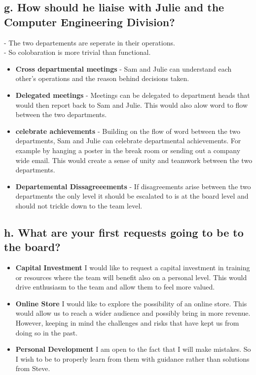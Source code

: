 \documentclass{article}
\begin{document}
\subsection{g. How should he liaise with Julie and the Computer Engineering Division?}
- The two departements are seperate in their operations. \\
- So colobaration is more trivial than functional. \\

\begin{itemize}
    \item \textbf{Cross departmental meetings} - Sam and Julie can understand each other's operations and the reason behind decisions taken.
    \item \textbf{Delegated meetings} - Meetings can be delegated to department heads that would then report back to Sam and Julie. This would also alow word to flow between the two departments.
    \item \textbf{celebrate achievements} - Building on the flow of word between the two departments, Sam and Julie can celebrate departmental achievements. For example by hanging a poster in the break room or sending out a company wide email. This would create a sense of unity and teamwork between the two departments.
    \item \textbf{Departemental Dissagreeements} - If disagreements arise between the two departments the only level it should be escalated to is at the board level and should not trickle down to the team level.
\end{itemize}


\subsection{h. What are your first requests going to be to the board?}

\begin{itemize}
    \item \textbf{Capital Investment} I would like to request a capital investment in training or resources where the team will benefit also on a personal level. This would drive enthusiasm to the team and allow them to feel more valued. \\
    \item \textbf{Online Store} I would like to explore the possibility of an online store. This would allow us to reach a wider audience and possibly bring in more revenue. However, keeping in mind the challenges and risks that have kept us from doing so in the past. \\
    \item \textbf{Personal Development} I am open to the fact that I will make mistakes. So I wish to be to properly learn from them with guidance rather than solutions from Steve. \\
\end{itemize}
\end{document}
